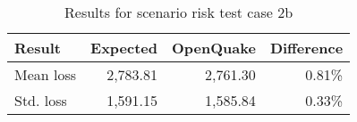 \begin{table}[htbp]

\centering
\begin{tabular}{ l r r r }

\hline
\rowcolor{anti-flashwhite}
\bf{Result} & \bf{Expected} & \bf{OpenQuake} & \bf{Difference}\\
\hline
Mean loss & 2,783.81 & 2,761.30 & 0.81\% \\
Std. loss & 1,591.15 & 1,585.84 & 0.33\% \\
\hline
\end{tabular}

\caption{Results for scenario risk test case 2b}
\label{tab:result-scenario-risk-2b}
\end{table}